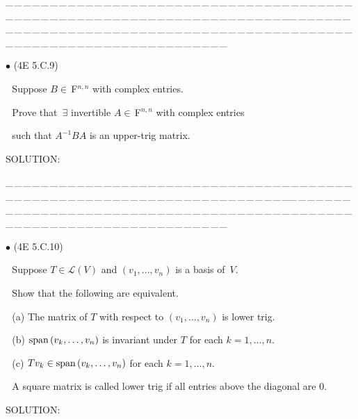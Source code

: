 \documentclass[a4paper, 11pt, UTF8]{article}
\def\Spn{\textup{span}\,}
\def\Lm{\mathcal{L}}
\def\Fbfc{$\,{\timesbf F}$}
\begin{document}
\begin{large}
\par
{\tiny \_\,\_\,\_\,\_\,\_\,\_\,\_\,\_\,\_\,\_\,\_\,\_\,\_\,\_\,\_\,\_\,\_\,\_\,\_\,\_\,\_\,\_\,\_\,\_\,\_\,\_\,\_\,\_\,\_\,\_\,\_\,\_\,\_\,\_\,\_\,\_\,\_\,\_\,\_\,\_\,\_\,\_\,\_\,\_\,\_\,\_\,\_\,\_\,\_\,\_\,\_\,\_\,\_\,\_\,\_\,\_\,\_\,\_\,\_\,\_\,\_\,\_\,\_\,\_\,\_\,\_\,\_\,\_\,\_\,\_\,\_\_\,\_\,\_\,\_\,\_\,\_\,\_\,\_\,\_\,\_\,\_\,\_\,\_\,\_\,\_\,\_\,\_\,\_\,\_\,\_\,\_\,\_\,\_\,\_\,\_\,\_\,\_\,\_\,\_\,\_\,\_\,\_\,\_\,\_\,\_\,\_\,\_\,\_\,\_\,\_\,\_\,\_\,\_\,\_\,\_\,\_\,\_\,\_\,\_\,\_\,\_\,\_\,\_\,\_\,\_\,\_\,\_\,\_\,\_\,\_\,\_\,\_\,\_\,\_\,\_\,\_\,\_\,\_\,\_\,\_\,\_}\par

{\small $\bullet$} ({\normalsize 4E 5.C.9})\par\,\, {\timessl\Large 
Suppose $B\in\Fbfc^{n,n}$ with complex entries.}\par\,\,
{\timessl\Large Prove that $\,\exists$ invertible $A\in\Fbfc^{n,n}$ with complex entries}\par\,\,
{\timessl\Large such that $A^{-1} BA$ is an upper-trig matrix.
}\par
{\timesbf S\footnotesize{OLUTION:}}\par\quad

\par
{\tiny \_\,\_\,\_\,\_\,\_\,\_\,\_\,\_\,\_\,\_\,\_\,\_\,\_\,\_\,\_\,\_\,\_\,\_\,\_\,\_\,\_\,\_\,\_\,\_\,\_\,\_\,\_\,\_\,\_\,\_\,\_\,\_\,\_\,\_\,\_\,\_\,\_\,\_\,\_\,\_\,\_\,\_\,\_\,\_\,\_\,\_\,\_\,\_\,\_\,\_\,\_\,\_\,\_\,\_\,\_\,\_\,\_\,\_\,\_\,\_\,\_\,\_\,\_\,\_\,\_\,\_\,\_\,\_\,\_\,\_\,\_\_\,\_\,\_\,\_\,\_\,\_\,\_\,\_\,\_\,\_\,\_\,\_\,\_\,\_\,\_\,\_\,\_\,\_\,\_\,\_\,\_\,\_\,\_\,\_\,\_\,\_\,\_\,\_\,\_\,\_\,\_\,\_\,\_\,\_\,\_\,\_\,\_\,\_\,\_\,\_\,\_\,\_\,\_\,\_\,\_\,\_\,\_\,\_\,\_\,\_\,\_\,\_\,\_\,\_\,\_\,\_\,\_\,\_\,\_\,\_\,\_\,\_\,\_\,\_\,\_\,\_\,\_\,\_\,\_\,\_\,\_}\par

{\small $\bullet$} ({\normalsize 4E 5.C.10})\par\,\,
 {\timessl\Large 
Suppose $T\in \Lm(V)$ and $(v_1 , \dots , v_n)$ is a basis of \,$V$.}\par\,\,
{\timessl\Large Show that the following are equivalent.
}\par\,\,
(a) {\timessl\Large
The matrix of $T$ with respect to $(v_1 , \dots , v_n)$ is lower trig.
}\par\,\,
(b) {\timessl\Large
$\Spn(v_k , \dots , v_n )$ is invariant under $T$ for each $k = 1, \dots , n$.
}\par\,\,
(c) {\timessl\Large
$Tv_k \in \Spn(v_k , \dots , v_n )$ for each $k = 1, \dots , n$.
}\par\,\,
{\timessl\small
A square matrix is called lower trig if all entries above the diagonal are $0$.}\par
{\timesbf S\footnotesize{OLUTION:}}\par\quad


\end{large}
\end{document}
